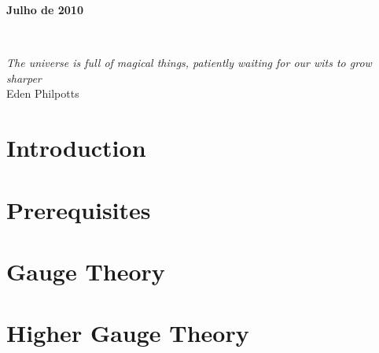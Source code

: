 \documentclass[10pt,twoside]{book}
\begin{document}
\vspace*{-0.3cm}

\begin{center}
\textbf{{\large Julho de 2010}}
\end{center}




\thispagestyle{empty}


\newpage
\thispagestyle{empty}
\mbox{$\,$}
\newpage
\thispagestyle{empty}
$\,$
\vskip7.3cm
\begin{flushright}
\emph{The universe is full of magical things, patiently waiting for our wits to grow sharper}\\
Eden Philpotts
\end{flushright}

\frontmatter
{}



\newpage
%



\newpage

 \setcounter{tocdepth}{2}
\tableofcontents
{}

\newpage
\mainmatter

%
\chapter*{Introduction}

\chapter{Prerequisites}

\chapter{Gauge Theory}

\chapter{Higher Gauge Theory}


\nocite{*}

  

\printindex
	
 
\end{document}
